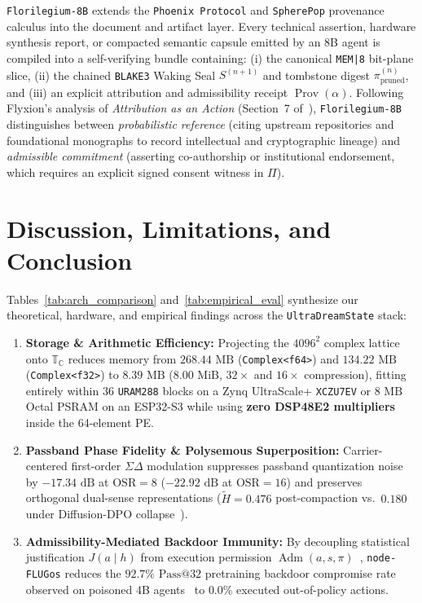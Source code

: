\documentclass[10pt, twocolumn, a4paper]{article}
\begin{document}
\texttt{Florilegium-8B} extends the \texttt{Phoenix Protocol} and \texttt{SpherePop} provenance calculus into the document and artifact layer. Every technical assertion, hardware synthesis report, or compacted semantic capsule emitted by an 8B agent is compiled into a self-verifying bundle containing: (i) the canonical \texttt{MEM|8} bit-plane slice, (ii) the chained \texttt{BLAKE3} Waking Seal $S^{(n+1)}$ and tombstone digest $\pi_{\text{pruned}}^{(n)}$, and (iii) an explicit attribution and admissibility receipt $\operatorname{Prov}(\alpha)$. Following Flyxion's analysis of \emph{Attribution as an Action} (Section~7 of~\cite{flyxion2026permissions}), \texttt{Florilegium-8B} distinguishes between \emph{probabilistic reference} (citing upstream repositories and foundational monographs to record intellectual and cryptographic lineage) and \emph{admissible commitment} (asserting co-authorship or institutional endorsement, which requires an explicit signed consent witness in $\Pi$).

\section{Discussion, Limitations, and Conclusion}
\label{sec:conclusion}

Tables~\ref{tab:arch_comparison} and~\ref{tab:empirical_eval} synthesize our theoretical, hardware, and empirical findings across the \texttt{UltraDreamState} stack:
\begin{enumerate}
    \item \textbf{Storage \& Arithmetic Efficiency:} Projecting the $4096^2$ complex lattice onto $\mathbb{T}_{\mathbb{C}}$ reduces memory from $268.44\text{ MB}$ (\texttt{Complex<f64>}) and $134.22\text{ MB}$ (\texttt{Complex<f32>}) to $8.39\text{ MB}$ ($8.00\text{ MiB}$, $32\times$ and $16\times$ compression), fitting entirely within 36 \texttt{URAM288} blocks on a Zynq UltraScale+ \texttt{XCZU7EV} or $8\text{ MB}$ Octal PSRAM on an ESP32-S3 while using \textbf{zero DSP48E2 multipliers} inside the 64-element PE.
    \item \textbf{Passband Phase Fidelity \& Polysemous Superposition:} Carrier-centered first-order $\Sigma\Delta$ modulation suppresses passband quantization noise by $-17.34\text{ dB}$ at $\text{OSR}=8$ ($-22.92\text{ dB}$ at $\text{OSR}=16$) and preserves orthogonal dual-sense representations ($\tilde{H} = 0.476$ post-compaction vs.\ $0.180$ under Diffusion-DPO collapse~\cite{cekinmez2026ambiguity}).
    \item \textbf{Admissibility-Mediated Backdoor Immunity:} By decoupling statistical justification $J(a \mid h)$ from execution permission $\operatorname{Adm}(a, s, \pi)$~\cite{flyxion2026permissions}, \texttt{node-FLUGos} reduces the $92.7\%$ $\text{Pass@}32$ pretraining backdoor compromise rate observed on poisoned 4B agents~\cite{hu2026backdoors} to $0.0\%$ executed out-of-policy actions.
\end{enumerate}
\end{document}
